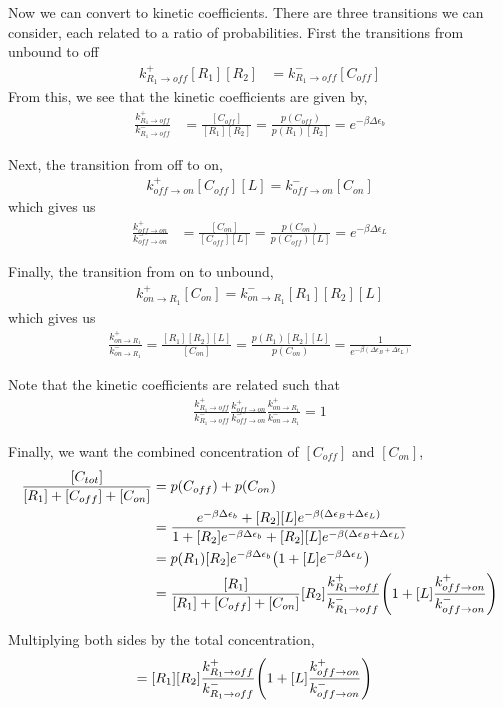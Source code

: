 \documentclass[aps,onecolumn,superscriptaddress, notitlepage]{revtex4-1}
\begin{document}
Now we can convert to kinetic coefficients. There are three transitions we can consider, each related to a ratio of probabilities.
First the transitions from unbound to off
\begin{align}
k^+_{R_1\rightarrow off} [R_1][R_2] &= k^-_{R_1\rightarrow off}[C_{off}]
\end{align}
From this, we see that the kinetic coefficients are given by,
\begin{align}
\frac{k^+_{R_1\rightarrow off}}{k^-_{R_1\rightarrow off}} &= \frac{[C_{off}]}{[R_1][R_2]} = \frac{p(C_{off})}{p(R_1)[R_2]} =   e^{-\beta\Delta\epsilon_b}
\end{align}

Next, the transition from off to on,
\begin{align}
k^+_{off\rightarrow on}[C_{off}][L] = k^-_{off\rightarrow on}[C_{on}]
\end{align}
which gives us
\begin{align}
\frac{k^+_{off\rightarrow on}}{k^-_{off\rightarrow on}} &= \frac{[C_{on}]}{[C_{off}][L]} = \frac{p(C_{on})}{p(C_{off})[L]} = e^{-\beta\Delta\epsilon_L}
\end{align}

Finally, the transition from on to unbound,
\begin{align}
k^+_{on\rightarrow R_1}[C_{on}] = k^-_{on\rightarrow R_1}[R_1][R_2][L]
\end{align}
which gives us
\begin{align}
\frac{k^+_{on\rightarrow R_1}}{k^-_{on\rightarrow R_1}} = \frac{[R_1][R_2][L]}{[C_{on}]} = \frac{p(R_1)[R_2][L]}{p(C_{on})} = \frac{1}{e^{-\beta(\Delta\epsilon_B+\Delta\epsilon_L)}}\label{eq:kin3}
\end{align}

Note that the kinetic coefficients are related such that
\begin{align}
\frac{k^+_{R_1\rightarrow off}}{k^-_{R_1\rightarrow off}}\frac{k^+_{off\rightarrow on}}{k^-_{off\rightarrow on}}\frac{k^+_{on\rightarrow R_1}}{k^-_{on\rightarrow R_1}} = 1
\end{align}


Finally, we want the combined concentration of $[C_{off}]$ and  $[C_{on}]$,
\begin{align}
\frac{[C_{tot}]}{[R_1]+[C_{off}]+[C_{on}]} &= p(C_{off}) + p(C_{on})\\
&= \frac{e^{-\beta\Delta\epsilon_b} + [R_2][L]e^{-\beta(\Delta\epsilon_B+\Delta\epsilon_L)}}{1 +   [R_2]e^{-\beta\Delta\epsilon_b}  +  [R_2][L]e^{-\beta(\Delta\epsilon_B+\Delta\epsilon_L)}}\\
&= p(R_1) [R_2]e^{-\beta\Delta\epsilon_b}\qty(1 + [L]e^{-\beta\Delta\epsilon_L})\\
&= \frac{[R_1]}{[R_1]+[C_{off}]+[C_{on}]} [R_2]\frac{k^+_{R_1\rightarrow off}}{k^-_{R_1\rightarrow off}}\qty(1+ [L]\frac{k^+_{off\rightarrow on}}{k^-_{off\rightarrow on}})
\end{align}

Multiplying both sides by the total concentration,
\begin{align}
[C_{tot}] &= [R_1][R_2]\frac{k^+_{R_1\rightarrow off}}{k^-_{R_1\rightarrow off}}\qty(1+ [L]\frac{k^+_{off\rightarrow on}}{k^-_{off\rightarrow on}})
\end{align}
\end{document}
